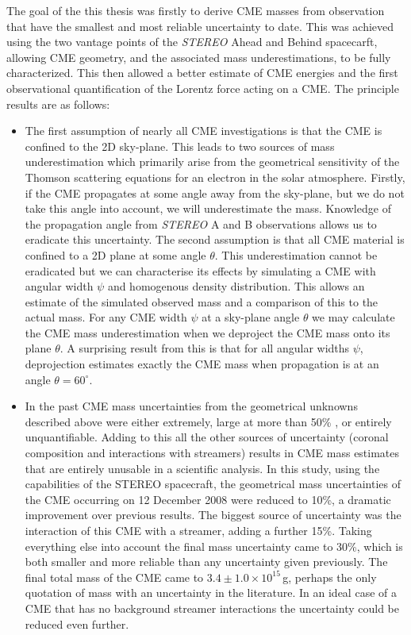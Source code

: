 The goal of the this thesis was firstly to derive CME masses from observation that have the smallest and most reliable uncertainty to date. This was achieved using the two vantage points of the \emph{STEREO} Ahead and Behind spacecarft, allowing CME geometry, and the associated mass underestimations, to be fully characterized. This then allowed a better estimate of CME energies and the first observational quantification of the Lorentz force acting on a CME. The principle results are as follows:
\begin{itemize}
\item The first assumption of nearly all CME investigations is that the CME is confined to the 2D sky-plane. This leads to two sources of mass underestimation which primarily arise from the geometrical sensitivity of the Thomson scattering equations for an electron in the solar atmosphere. Firstly, if the CME propagates at some angle away from the sky-plane, but we do not take this angle into account, we will underestimate the mass. Knowledge of the propagation angle from \emph{STEREO} A and B observations allows us to eradicate this uncertainty. The second assumption is that all CME material is confined to a 2D plane at some angle $\theta$. This underestimation cannot be eradicated but we can characterise its effects by simulating a CME with angular width $\psi$ and homogenous density distribution. This allows an estimate of the simulated observed mass and a comparison of this to the actual mass. For any CME width $\psi$ at a sky-plane angle $\theta$ we may calculate the CME mass underestimation when we deproject the CME mass onto its plane $\theta$. A surprising result from this is that for all angular widths $\psi$, deprojection estimates exactly the CME mass when propagation is at an angle $\theta=60^{\circ}$.

\item In the past CME mass uncertainties from the geometrical unknowns described above were either extremely, large at more than 50\% \citep{vou00}, or entirely unquantifiable. Adding to this all the other sources of uncertainty (coronal composition and interactions with streamers) results in CME mass estimates that are entirely unusable in a scientific analysis. In this study, using the capabilities of the STEREO spacecraft, the geometrical mass uncertainties of the CME occurring on 12 December 2008 were reduced to 10\%, a dramatic improvement over previous results. The biggest source of uncertainty was the interaction of this CME with a streamer, adding a further 15\%. Taking everything else into account the final mass uncertainty came to 30\%, which is both smaller and more reliable than any uncertainty given previously. The final total mass of the CME came to
$3.4\pm1.0\times10^{15}$\,g, perhaps the only quotation of mass with an uncertainty in the literature. In an ideal case of a CME that has no background streamer interactions the uncertainty could be reduced even further.


\end{itemize}
